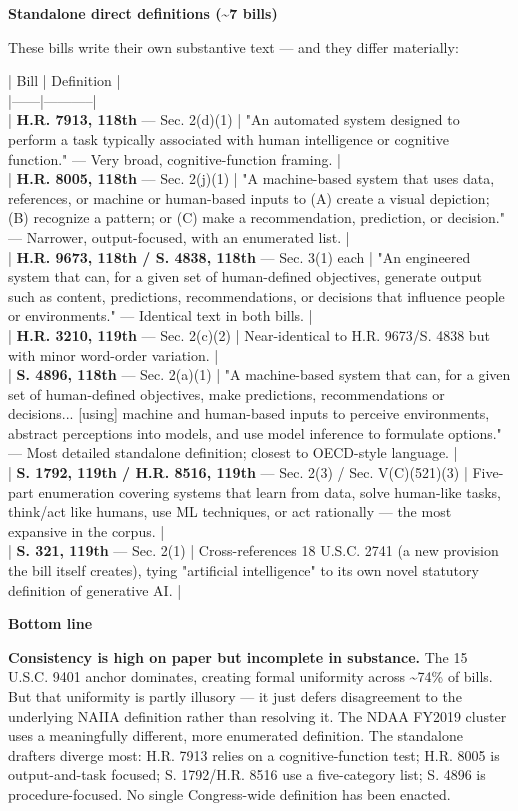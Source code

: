 \documentclass[11pt]{article}
\begin{document}
\textbf{Standalone direct definitions (\textasciitilde{}7 bills)}

These bills write their own substantive text --- and they differ materially:

| Bill | Definition | \\
|------|-----------| \\
| \textbf{H.R. 7913, 118th} --- Sec. 2(d)(1) | "An automated system designed to perform a task typically associated with human intelligence or cognitive function." --- Very broad, cognitive-function framing. | \\
| \textbf{H.R. 8005, 118th} --- Sec. 2(j)(1) | "A machine-based system that uses data, references, or machine or human-based inputs to (A) create a visual depiction; (B) recognize a pattern; or (C) make a recommendation, prediction, or decision." --- Narrower, output-focused, with an enumerated list. | \\
| \textbf{H.R. 9673, 118th / S. 4838, 118th} --- Sec. 3(1) each | "An engineered system that can, for a given set of human-defined objectives, generate output such as content, predictions, recommendations, or decisions that influence people or environments." --- Identical text in both bills. | \\
| \textbf{H.R. 3210, 119th} --- Sec. 2(c)(2) | Near-identical to H.R. 9673/S. 4838 but with minor word-order variation. | \\
| \textbf{S. 4896, 118th} --- Sec. 2(a)(1) | "A machine-based system that can, for a given set of human-defined objectives, make predictions, recommendations or decisions... [using] machine and human-based inputs to perceive environments, abstract perceptions into models, and use model inference to formulate options." --- Most detailed standalone definition; closest to OECD-style language. | \\
| \textbf{S. 1792, 119th / H.R. 8516, 119th} --- Sec. 2(3) / Sec. V(C)(521)(3) | Five-part enumeration covering systems that learn from data, solve human-like tasks, think/act like humans, use ML techniques, or act rationally --- the most expansive in the corpus. | \\
| \textbf{S. 321, 119th} --- Sec. 2(1) | Cross-references 18 U.S.C. 2741 (a new provision the bill itself creates), tying "artificial intelligence" to its own novel statutory definition of generative AI. |

\textbf{Bottom line}

\textbf{Consistency is high on paper but incomplete in substance.} The 15 U.S.C. 9401 anchor dominates, creating formal uniformity across \textasciitilde{}74\% of bills. But that uniformity is partly illusory --- it just defers disagreement to the underlying NAIIA definition rather than resolving it. The NDAA FY2019 cluster uses a meaningfully different, more enumerated definition. The standalone drafters diverge most: H.R. 7913 relies on a cognitive-function test; H.R. 8005 is output-and-task focused; S. 1792/H.R. 8516 use a five-category list; S. 4896 is procedure-focused. No single Congress-wide definition has been enacted.
\end{document}
